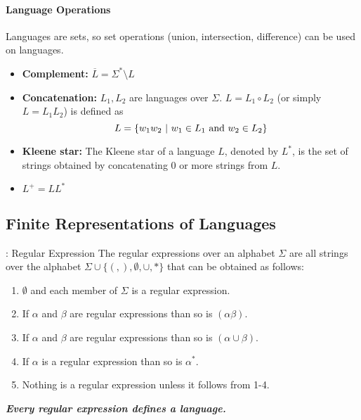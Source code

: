 \begin{multicols}{2}
\paragraph{Language Operations}

Languages are sets, so set operations (union, intersection, difference) can be used on languages.
\begin{itemize}
  \item \textbf{Complement:} $\overline{L} = \Sigma^* \setminus L$
  \item \textbf{Concatenation:} $L_1, L_2$ are languages over $\Sigma$. $L = L_1 \circ L_2$ (or simply $L = L_1L_2$) is defined as
    \begin{equation*}
      L = \left\{ w_1w_2\ |\ w_1 \in L_1 \textnormal{ and } w_2 \in L_2 \right\}
    \end{equation*}
  \item \textbf{Kleene star:} The Kleene star of a language $L$, denoted by $L^*$, is the set of strings obtained by concatenating $0$ or more strings from $L$.
  \item $L^+ = LL^*$  
\end{itemize}

\vfill\null
\columnbreak

\subsection{Finite Representations of Languages}

\begin{definition}{: Regular Expression}
  The regular expressions over an alphabet $\Sigma$ are all strings over the alphabet $\Sigma \cup \{( , ), \emptyset, \cup, *\}$ that can be obtained as follows:
  \begin{enumerate}
    \item $\emptyset$ and each member of $\Sigma$ is a regular expression.
    \item If $\alpha$ and $\beta$ are regular expressions than so is $(\alpha\beta)$.
    \item If $\alpha$ and $\beta$ are regular expressions than so is $(\alpha \cup \beta)$.
    \item If $\alpha$ is a regular expression than so is $\alpha^*$.
    \item Nothing is a regular expression unless it follows from 1-4.
  \end{enumerate}
\end{definition}

\textit{\textbf{Every regular expression defines a language.}}


\end{multicols}
